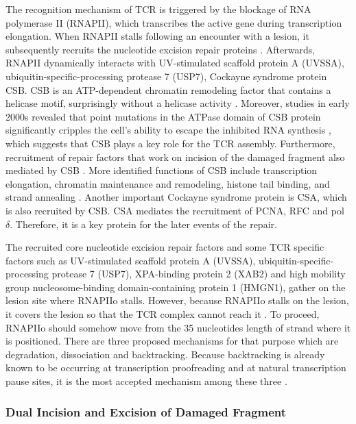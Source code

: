 The recognition mechanism of TCR is triggered by the blockage of RNA polymerase II (RNAPII), which transcribes the active gene during transcription elongation. When RNAPII stalls following an encounter with a lesion, it subsequently recruits the nucleotide excision repair proteins \citep{svejstrup2002mechanisms}. Afterwards, RNAPII dynamically interacts with UV-stimulated scaffold protein A (UVSSA), ubiquitin-specific-processing protease 7 (USP7), Cockayne syndrome protein CSB. CSB is an ATP-dependent chromatin remodeling factor that contains a helicase motif, surprisingly without a helicase activity \citep{selby1997human}. Moreover, studies in early 2000s revealed that point mutations in the ATPase domain of CSB protein significantly cripples the cell’s ability to escape the inhibited RNA synthesis \citep{citterio1998biochemical,muftuoglu2002phenotypic}, which suggests that CSB plays a key role for the TCR assembly. Furthermore, recruitment of repair factors that work on incision of the damaged fragment also mediated by CSB \citep{fousteri2006cockayne}. More identified functions of CSB include transcription elongation, chromatin maintenance and remodeling, histone tail binding, and strand annealing \citep{selby1997cockayne}. Another important Cockayne syndrome protein is CSA, which is also recruited by CSB. CSA mediates the recruitment of PCNA, RFC and pol $\delta$. Therefore, it is a key protein for the later events of the repair.

The recruited core nucleotide excision repair factors and some TCR specific factors such as UV-stimulated scaffold protein A (UVSSA), ubiquitin-specific-processing protease 7 (USP7), XPA-binding protein 2 (XAB2) and high mobility group nucleosome-binding domain-containing protein 1 (HMGN1), gather on the lesion site where RNAPIIo stalls. However, because RNAPIIo stalls on the lesion, it covers the lesion so that the TCR complex cannot reach it \citep{tornaletti1999structural}. To proceed, RNAPIIo should somehow move from the 35 nucleotides length of strand where it is positioned. There are three proposed mechanisms for that purpose which are degradation, dissociation and backtracking. Because backtracking is already known to be occurring at transcription proofreading and at natural transcription pause sites, it is the most accepted mechanism among these three \citep{marteijn2014understanding}. 

\subsubsection{Dual Incision and Excision of Damaged Fragment}

